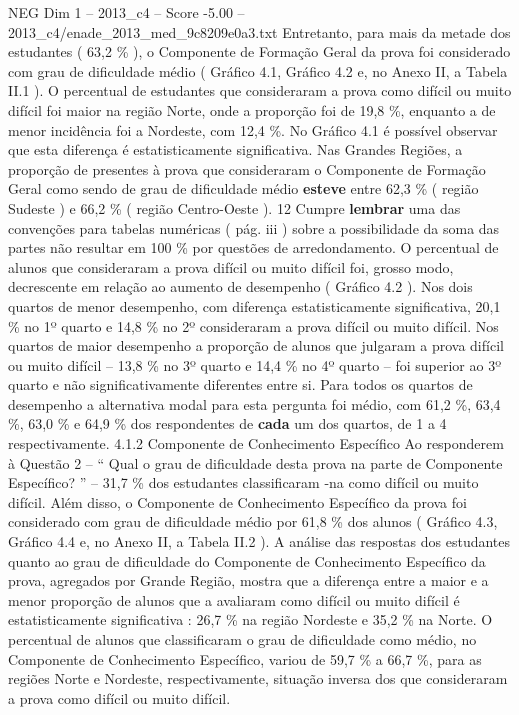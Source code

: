 \begin{textsample}{NEG Dim 1 – 2013\_c4 – Score -5.00 – 2013\_c4/enade\_2013\_med\_9c8209e0a3.txt}
Entretanto, para mais da metade dos estudantes ( 63,2 \% ), o Componente de Formação Geral da prova foi considerado com grau de dificuldade médio ( Gráfico 4.1, Gráfico 4.2 e, no Anexo II, a Tabela II.1 ).
O percentual de estudantes que consideraram a prova como difícil ou muito difícil foi maior na região Norte, onde a proporção foi de 19,8 \%, enquanto a de menor incidência foi a Nordeste, com 12,4 \%.
No Gráfico 4.1 é possível observar que esta diferença é estatisticamente significativa.
Nas Grandes Regiões, a proporção de presentes à prova que consideraram o Componente de Formação Geral como sendo de grau de dificuldade médio \textbf{esteve} entre 62,3 \% ( região Sudeste ) e 66,2 \% ( região Centro-Oeste ). 12 Cumpre \textbf{lembrar} uma das convenções para tabelas numéricas ( pág. iii ) sobre a possibilidade da soma das partes não resultar em 100 \% por questões de arredondamento.
O percentual de alunos que consideraram a prova difícil ou muito difícil foi, grosso modo, decrescente em relação ao aumento de desempenho ( Gráfico 4.2 ).
Nos dois quartos de menor desempenho, com diferença estatisticamente significativa, 20,1 \% no 1º quarto e 14,8 \% no 2º consideraram a prova difícil ou muito difícil.
Nos quartos de maior desempenho a proporção de alunos que julgaram a prova difícil ou muito difícil – 13,8 \% no 3º quarto e 14,4 \% no 4º quarto – foi superior ao 3º quarto e não significativamente diferentes entre si.
Para todos os quartos de desempenho a alternativa modal para esta pergunta foi médio, com 61,2 \%, 63,4 \%, 63,0 \% e 64,9 \% dos respondentes de \textbf{cada} um dos quartos, de 1 a 4 respectivamente. 4.1.2 Componente de Conhecimento Específico Ao responderem à Questão 2 – “ Qual o grau de dificuldade desta prova na parte de Componente Específico? ” – 31,7 \% dos estudantes classificaram -na como difícil ou muito difícil.
Além disso, o Componente de Conhecimento Específico da prova foi considerado com grau de dificuldade médio por 61,8 \% dos alunos ( Gráfico 4.3, Gráfico 4.4 e, no Anexo II, a Tabela II.2 ).
A análise das respostas dos estudantes quanto ao grau de dificuldade do Componente de Conhecimento Específico da prova, agregados por Grande Região, mostra que a diferença entre a maior e a menor proporção de alunos que a avaliaram como difícil ou muito difícil é estatisticamente significativa : 26,7 \% na região Nordeste e 35,2 \% na Norte.
O percentual de alunos que classificaram o grau de dificuldade como médio, no Componente de Conhecimento Específico, variou de 59,7 \% a 66,7 \%, para as regiões Norte e Nordeste, respectivamente, situação inversa dos que consideraram a prova como difícil ou muito difícil.

\end{textsample}
